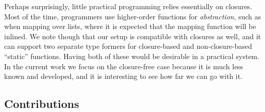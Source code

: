 \documentclass[acmsmall,screen,review,anonymous]{acmart}
\theoremstyle{remark}
\begin{document}
Perhaps surprisingly, little practical programming relies essentially on
closures. Most of the time, programmers use higher-order functions for
\emph{abstraction}, such as when mapping over lists, where it is expected that
the mapping function will be inlined. We note though that our setup is
compatible with closures as well, and it can support two separate type formers
for closure-based and non-closure-based ``static'' functions. Having both of
these would be desirable in a practical system. In the current work we focus on
the closure-free case because it is much less known and developed, and it is
interesting to see how far we can go with it.



\subsection{Contributions}
\end{document}
